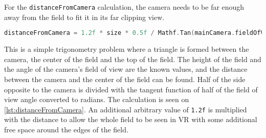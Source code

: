 For the \texttt{distanceFromCamera} calculation, the camera needs to be far enough away from the field to fit it in its far clipping view.
\begin{lstlisting}[caption={Calculation of the distance between the camera and field}, captionpos=b,language=C,label={lst:distanceFromCamera}]
    distanceFromCamera = 1.2f * size * 0.5f / Mathf.Tan(mainCamera.fieldOfView * 0.5f * Mathf.Deg2Rad);
\end{lstlisting}
This is a simple trigonometry problem where a triangle is formed between the camera, the center of the field and the top of the field.
The height of the field and the angle of the camera's field of view are the known values, and the distance between the camera and the center of the field can be found. 
Half of the side opposite to the camera is divided with the tangent function of half of the field of view angle converted to radians.
The calculation is seen on \autoref{lst:distanceFromCamera}.
An additional arbitrary value of \texttt{1.2f} is multiplied with the distance to allow the whole field to be seen in VR with some additional free space around the edges of the field.
